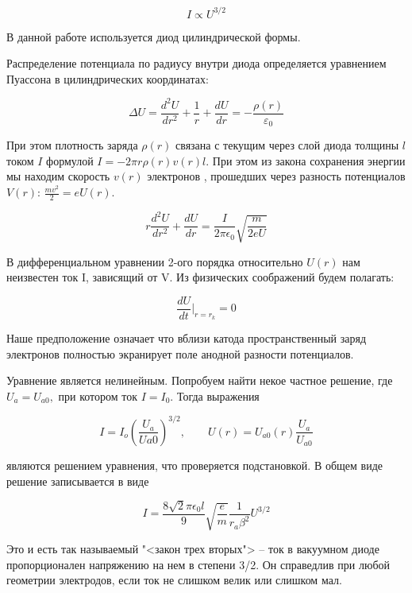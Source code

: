 \documentclass[a4paper, 12pt]{article}%
\begin{document}
	$$ I \propto  U^{3/2} $$
	
	В данной работе используется диод цилиндрической формы.
	
	Распределение потенциала по радиусу внутри диода определяется уравнением Пуассона в цилиндрических координатах:
	
	\begin{equation}
		\Delta U = \dfrac{d^2U}{dr^2} + \dfrac{1}{r} + \dfrac{dU}{dr} = - \dfrac{\rho(r)}{\varepsilon_0}
	\end{equation}
	
	При этом плотность заряда $ \rho(r) $ связана с текущим через слой диода толщины $ l $ током $ I $ формулой $ I = -2\pi r \rho(r)v(r)l$. При этом из закона сохранения энергии мы находим скорость $ v(r) $ электронов , прошедших через разность потенциалов $ V(r) $: $ \frac{mv^2}{2} = eU(r) $.
	
	\begin{equation}\label{ur}
		r \dfrac{d^2U}{dr^2} + \dfrac{dU}{dr} = \dfrac{I}{2\pi\epsilon_0}\sqrt{\dfrac{m}{2eU}}
	\end{equation}
	
	 В дифференциальном уравнении 2-ого порядка относительно $ U(r) $ нам неизвестен ток I, зависящий от V. Из физических соображений будем полагать:
	
	\begin{equation}
		\dfrac{dU}{dt}\bigg |_{r=r_k} = 0
	\end{equation} 
	
	Наше предположение означает что вблизи катода пространственный заряд электронов полностью экранирует поле анодной разности потенциалов.
	
	Уравнение является нелинейным. Попробуем  найти некое частное решение, где $ U_a = U_{a0}, $ при котором ток $ I = I_0 $. Тогда выражения 
	
	\begin{equation}
		I = I_o \left( \dfrac{U_a}{U{a0}} \right) ^{3/2}, \qquad U(r) = U_{a0}(r)\dfrac{U_a}{U_{a0}}
	\end{equation}
	
	являются решением уравнения, что проверяется подстановкой. В общем виде решение записывается в виде
	
	\begin{equation}
		I = \dfrac{8\sqrt{2}\pi \epsilon_0 l}{9}\sqrt{\dfrac{e}{m}}\dfrac{1}{r_a\beta^2} U^{3/2}
	\end{equation}
	
	Это и есть так называемый "<закон трех вторых"> -- ток в вакуумном диоде пропорционален напряжению на нем в степени 3/2. Он справедлив при любой геометрии электродов, если ток не слишком велик или слишком мал. 
	
\end{document}
